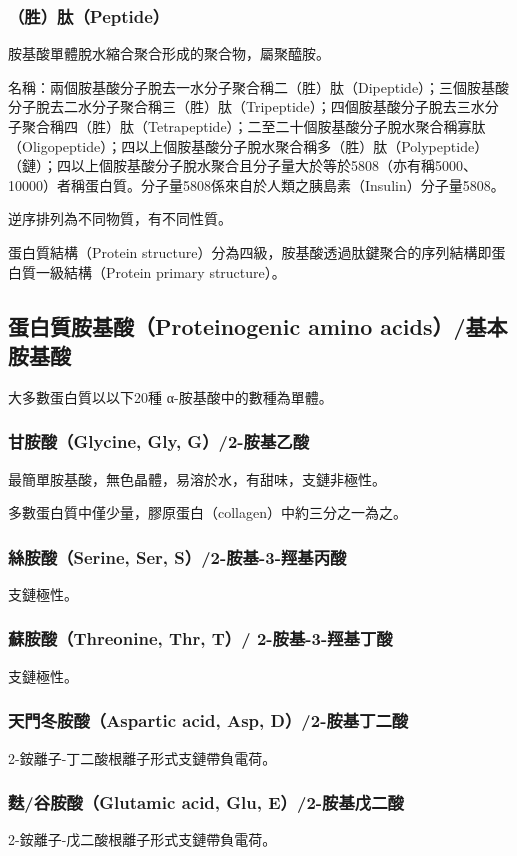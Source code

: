 \documentclass[a4paper,12pt]{report}
\begin{document}
\begin{itemize}
\begin{itemize}
\subsubsection{（胜）肽（Peptide）}
胺基酸單體脫水縮合聚合形成的聚合物，屬聚醯胺。

名稱：兩個胺基酸分子脫去一水分子聚合稱二（胜）肽（Dipeptide）；三個胺基酸分子脫去二水分子聚合稱三（胜）肽（Tripeptide）；四個胺基酸分子脫去三水分子聚合稱四（胜）肽（Tetrapeptide）；二至二十個胺基酸分子脫水聚合稱寡肽（Oligopeptide）；四以上個胺基酸分子脫水聚合稱多（胜）肽（Polypeptide）（鏈）；四以上個胺基酸分子脫水聚合且分子量大於等於5808（亦有稱5000、10000）者稱蛋白質。分子量5808係來自於人類之胰島素（Insulin）分子量5808。

逆序排列為不同物質，有不同性質。

蛋白質結構（Protein structure）分為四級，胺基酸透過肽鍵聚合的序列結構即蛋白質一級結構（Protein primary structure）。
\subsection{蛋白質胺基酸（Proteinogenic amino acids）/基本胺基酸}
大多數蛋白質以以下20種 α-胺基酸中的數種為單體。
\subsubsection{甘胺酸（Glycine, Gly, G）/2-胺基乙酸}
最簡單胺基酸，無色晶體，易溶於水，有甜味，支鏈非極性。

多數蛋白質中僅少量，膠原蛋白（collagen）中約三分之一為之。
\subsubsection{絲胺酸（Serine, Ser, S）/2-胺基-3-羥基丙酸}
支鏈極性。
\subsubsection{蘇胺酸（Threonine, Thr, T）/
2-胺基-3-羥基丁酸}
支鏈極性。
\subsubsection{天門冬胺酸（Aspartic acid, Asp, D）/2-胺基丁二酸}
2-銨離子-丁二酸根離子形式支鏈帶負電荷。
\subsubsection{麩/谷胺酸（Glutamic acid, Glu, E）/2-胺基戊二酸}
2-銨離子-戊二酸根離子形式支鏈帶負電荷。


\end{itemize}
\end{itemize}
\end{document}
